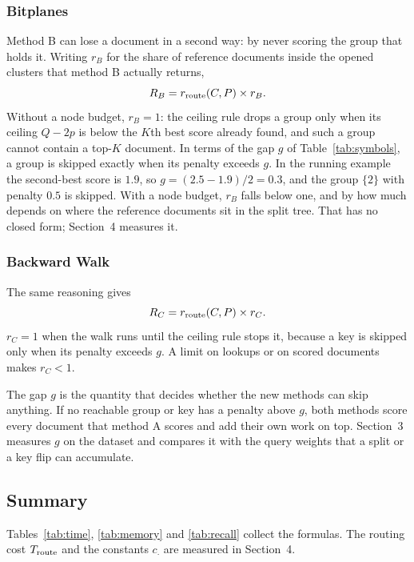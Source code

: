 \subsubsection{Bitplanes}
Method B can lose a document in a second way: by never scoring the group that holds it.
Writing $r_B$ for the share of reference documents inside the opened clusters that method B
actually returns,
\[
 R_B=r_{\rm route}(C,P)\times r_B.
\]
Without a node budget, $r_B=1$: the ceiling rule drops a group only when its ceiling
$Q-2p$ is below the $K$th best score already found, and such a group cannot contain a
top-$K$ document. In terms of the gap $g$ of Table~\ref{tab:symbols}, a group is skipped
exactly when its penalty exceeds $g$. In the running example the second-best score is
$1.9$, so $g=(2.5-1.9)/2=0.3$, and the group $\{2\}$ with penalty $0.5$ is skipped.
With a node budget, $r_B$ falls below one, and by how much depends on where the reference
documents sit in the split tree. That has no closed form; Section~4 measures it.

\subsubsection{Backward Walk}
The same reasoning gives
\[
 R_C=r_{\rm route}(C,P)\times r_C.
\]
$r_C=1$ when the walk runs until the ceiling rule stops it, because a key is skipped only
when its penalty exceeds $g$. A limit on lookups or on scored documents makes $r_C<1$.

The gap $g$ is the quantity that decides whether the new methods can skip anything. If no
reachable group or key has a penalty above $g$, both methods score every document that
method A scores and add their own work on top. Section~3 measures $g$ on the dataset and
compares it with the query weights that a split or a key flip can accumulate.

\subsection{Summary}
Tables~\ref{tab:time}, \ref{tab:memory} and \ref{tab:recall} collect the formulas. The
routing cost $T_{\rm route}$ and the constants $c_{\cdot}$ are measured in Section~4.

